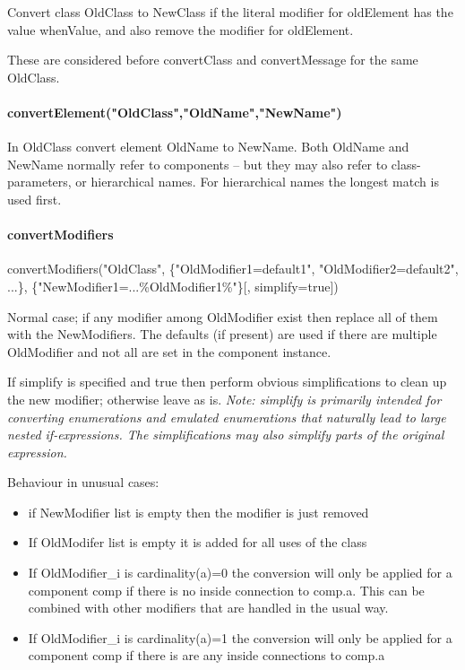 \documentclass[10pt,a4paper]{report}
\def\doublelabel#1{\label{#1}}
\begin{document}
Convert class OldClass to NewClass if the literal modifier for
oldElement has the value whenValue, and also remove the modifier for
oldElement.

These are considered before convertClass and convertMessage for the same
OldClass.

\paragraph*{convertElement("OldClass","OldName","NewName")}\doublelabel{convertelementoldclassoldnamenewname}

In OldClass convert element OldName to NewName. Both OldName and NewName
normally refer to components -- but they may also refer to
class-parameters, or hierarchical names. For hierarchical names the
longest match is used first.

\paragraph*{convertModifiers}\doublelabel{convertmodifiers}

convertModifiers("OldClass",
\{"OldModifier1=default1", "OldModifier2=default2", ...\},
\{"NewModifier1=...\%OldModifier1\%"\}{[}, simplify=true{]})

Normal case; if any modifier among OldModifier exist then replace all of
them with the NewModifiers. The defaults (if present) are used if there
are multiple OldModifier and not all are set in the component instance.

If simplify is specified and true then perform obvious simplifications
to clean up the new modifier; otherwise leave as is. \emph{Note:
simplify is primarily intended for converting enumerations and emulated
enumerations that naturally lead to large nested if-expressions. The
simplifications may also simplify parts of the original expression.}

Behaviour in unusual cases:

\begin{itemize}
\item
  if NewModifier list is empty then the modifier is just removed
\item
  If OldModifer list is empty it is added for all uses of the class
\item
  If OldModifier\_i is cardinality(a)=0 the conversion will only be
  applied for a component comp if there is no inside connection to
  comp.a. This can be combined with other modifiers that are handled in
  the usual way.
\item
  If OldModifier\_i is cardinality(a)=1 the conversion will only be
  applied for a component comp if there is are any inside connections to
  comp.a
\end{itemize}
\end{document}
